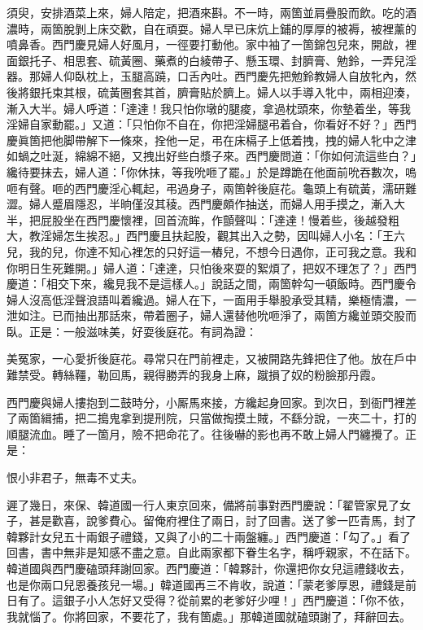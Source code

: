 須臾，安排酒菜上來，婦人陪定，把酒來斟。不一時，兩箇並肩疊股而飲。吃的酒濃時，兩箇脫剝上床交歡，自在頑耍。婦人早已床炕上鋪的厚厚的被褥，被裡薰的噴鼻香。西門慶見婦人好風月，一徑要打動他。家中袖了一箇錦包兒來，開啟，裡面銀托子、相思套、硫黃圈、藥煮的白綾帶子、懸玉環、封臍膏、勉鈴，一弄兒淫器。那婦人仰臥枕上，玉腿高蹺，口舌內吐。西門慶先把勉鈴教婦人自放牝內，然後將銀托束其根，硫黃圈套其首，臍膏貼於臍上。婦人以手導入牝中，兩相迎湊，漸入大半。婦人呼道：「達達！我只怕你墩的腿痠，拿過枕頭來，你墊着坐，等我淫婦自家動罷。」{}又道：「只怕你不自在，你把淫婦腿弔着㒲，你看好不好？」西門慶眞箇把他脚帶解下一條來，拴他一足，弔在床槅子上低着拽，拽的婦人牝中之津如蝸之吐涎，綿綿不絕，又拽出好些白漿子來。西門慶問道：「你如何流這些白？」纔待要抹去，婦人道：「你休抹，等我吮咂了罷。」於是蹲跪在他面前吮吞數次，嗚咂有聲。咂的西門慶淫心輒起，弔過身子，兩箇幹後庭花。龜頭上有硫黃，濡研難澀。婦人蹙眉隱忍，半晌僅沒其稜。西門慶頗作抽送，而婦人用手摸之，漸入大半，把屁股坐在西門慶懷裡，回首流眸，作顫聲叫：「達達！慢着些，後越發粗大，教淫婦怎生挨忍。」西門慶且扶起股，觀其出入之勢，因叫婦人小名：「王六兒，我的兒，你達不知心裡怎的只好這一樁兒，不想今日遇你，正可我之意。我和你明日生死難開。」婦人道：「達達，只怕後來耍的絮煩了，把奴不理怎了？」西門慶道：「相交下來，纔見我不是這樣人。」說話之間，兩箇幹勾一頓飯時。西門慶令婦人沒高低淫聲浪語叫着纔過。婦人在下，一面用手舉股承受其精，樂極情濃，一泄如注。已而抽出那話來，帶着圈子，婦人還替他吮咂淨了，兩箇方纔並頭交股而臥。正是：一般滋味美，好耍後庭花。有詞為證：

\begin{myquote}
美冤家，一心愛折後庭花。尋常只在門前裡走，又被開路先鋒把住了他。放在戶中難禁受。轉絲韁，勒回馬，親得勝弄的我身上麻，蹴損了奴的粉臉那丹霞。
\end{myquote}

西門慶與婦人摟抱到二鼓時分，小厮馬來接，方纔起身回家。到次日，到衙門裡差了兩箇緝捕，把二搗鬼拿到提刑院，只當做掏摸土賊，不繇分說，一夾二十，打的順腿流血。睡了一箇月，險不把命花了。往後嚇的影也再不敢上婦人門纏攪了。正是：

\begin{myquote}
恨小非君子，無毒不丈夫。
\end{myquote}

遲了幾日，來保、韓道國一行人東京回來，備將前事對西門慶說：「翟管家見了女子，甚是歡喜，說爹費心。留俺府裡住了兩日，討了回書。送了爹一匹青馬，封了韓夥計女兒五十兩銀子禮錢，又與了小的二十兩盤纏。」西門慶道：「勾了。」看了回書，書中無非是知感不盡之意。自此兩家都下眷生名字，稱呼親家，{}不在話下。韓道國與西門慶磕頭拜謝回家。西門慶道：「韓夥計，你還把你女兒這禮錢收去，也是你兩口兒恩養孩兒一場。」韓道國再三不肯收，說道：「蒙老爹厚恩，禮錢是前日有了。這銀子小人怎好又受得？從前累的老爹好少哩！」西門慶道：「你不依，我就惱了。你將回家，不要花了，我有箇處。」那韓道國就磕頭謝了，拜辭回去。

